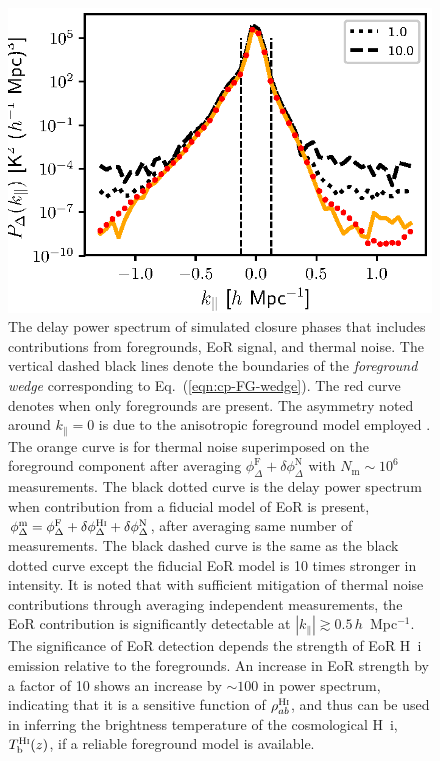 \documentclass[
reprint,
superscriptaddress,
amsmath,
amssymb,
aps,
prd
]{revtex4-1}
\begin{document}
\begin{figure}[htb]
\includegraphics[width=\linewidth]{cpdps_150MHz_nsamples_1048576}
\caption{The delay power spectrum of simulated closure phases that includes contributions from foregrounds, EoR signal, and thermal noise. The vertical dashed black lines denote the boundaries of the {\it foreground wedge} corresponding to Eq.~(\ref{eqn:cp-FG-wedge}). The red curve denotes when only foregrounds are present. The asymmetry noted around $k_\parallel=0$ is due to the anisotropic foreground model employed \cite{thy15a}. The orange curve is for thermal noise superimposed on the foreground component after averaging $\phi_\Delta^\textrm{F}+\delta\phi_\Delta^\textrm{N}$ with $N_\textrm{m} \sim 10^6$ measurements. The black dotted curve is the delay power spectrum when contribution from a fiducial model of EoR is present, $\phi_\Delta^\textrm{m}=\phi_\Delta^\textrm{F}+\delta\phi_\Delta^\textrm{H{\sc i}}+\delta\phi_\Delta^\textrm{N}$, after averaging same number of measurements. The black dashed curve is the same as the black dotted curve except the fiducial EoR model is 10 times stronger in intensity. It is noted that with sufficient mitigation of thermal noise contributions through averaging independent measurements, the EoR contribution is significantly detectable at $|k_\parallel| \gtrsim 0.5\,h$~Mpc$^{-1}$. The significance of EoR detection depends the strength of EoR H~{\sc i} emission relative to the foregrounds. An increase in EoR strength by a factor of 10 shows an increase by $\sim 100$ in power spectrum, indicating that it is a sensitive function of $\rho_{ab}^\textrm{H{\sc i}}$, and thus can be used in inferring the brightness temperature of the cosmological H~{\sc i}, $T_\textrm{b}^\textrm{H{\sc i}}(z)$, if a reliable foreground model is available. \label{fig:cpdps}}
\end{figure}
\end{document}
